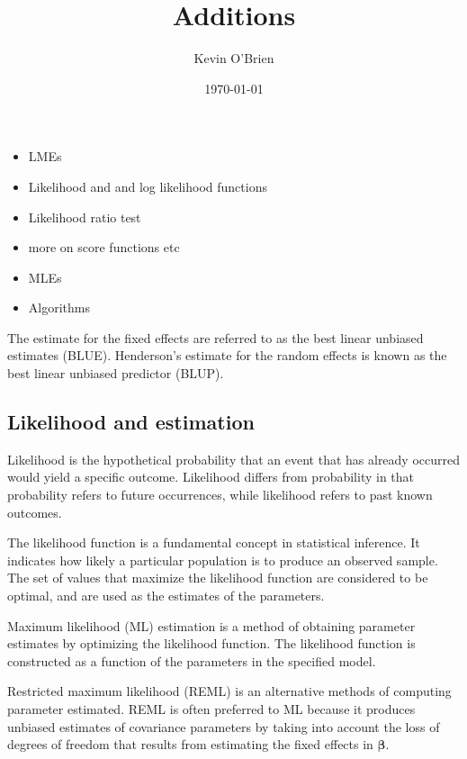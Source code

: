 \documentclass[12pt, a4paper]{report}
\begin{document}
\author{Kevin O'Brien}
\title{Additions}
\date{\today}
\maketitle

\tableofcontents \setcounter{tocdepth}{2}

\begin{itemize}
\item LMEs
\item Likelihood and and log likelihood functions
\item Likelihood ratio test
\item more on score functions etc
\item MLEs
\item Algorithms

\end{itemize}

The estimate for the fixed effects are referred to as the best linear unbiased estimates (BLUE). Henderson's estimate for the random effects is known as the best linear unbiased predictor (BLUP).

\subsection{Likelihood and estimation}

Likelihood is the hypothetical probability that an event that has
already occurred would yield a specific outcome. Likelihood
differs from probability in that probability refers to future
occurrences, while likelihood refers to past known outcomes.

The likelihood function is a fundamental concept in statistical
inference. It indicates how likely a particular population is to
produce an observed sample. The set of values that maximize the
likelihood function are considered to be optimal, and are used as
the estimates of the parameters.

Maximum likelihood (ML) estimation is a method of obtaining
parameter estimates by optimizing the likelihood function. The
likelihood function is constructed as a function of the parameters
in the specified model.

Restricted maximum likelihood (REML) is an alternative methods of
computing parameter estimated. REML is often preferred to ML
because it produces unbiased estimates of covariance parameters by
taking into account the loss of degrees of freedom that results
from estimating the fixed effects in $\boldsymbol{\beta}$.
\end{document}

